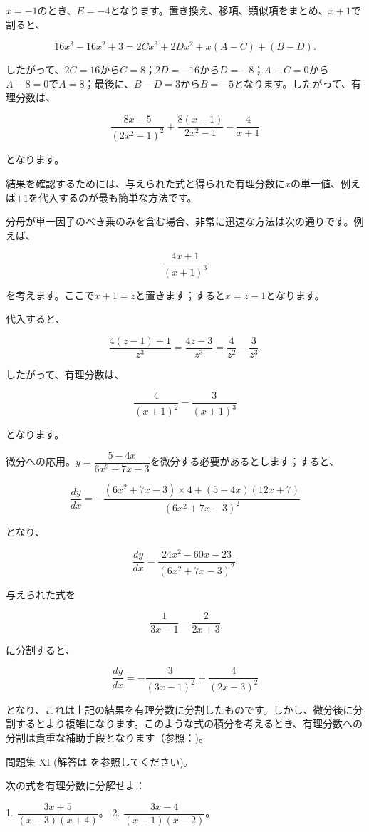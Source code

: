 \documentclass[a4paper,11pt,openany]{ltjsbook}
\begin{document}
$x = -1$のとき、$E = -4$となります。置き換え、移項、類似項をまとめ、$x+1$で割ると、

\[
16x^3 - 16x^2 + 3 = 2Cx^3 + 2Dx^2 + x(A - C) + (B - D).
\]

したがって、$2C = 16$から$C = 8$；$2D = -16$から$D = -8$；$A - C = 0$から$A - 8 = 0$で$A = 8$；最後に、$B - D = 3$から$B = -5$となります。したがって、有理分数は、

\[
\frac{8x-5}{(2x^2-1)^2} + \frac{8(x-1)}{2x^2-1} - \frac{4}{x+1}
\]

となります。

結果を確認するためには、与えられた式と得られた有理分数に$x$の単一値、例えば$+1$を代入するのが最も簡単な方法です。

分母が単一因子のべき乗のみを含む場合、非常に迅速な方法は次の通りです。例えば、

\[
\frac{4x + 1}{(x + 1)^3}
\]

を考えます。ここで$x + 1 = z$と置きます；すると$x = z - 1$となります。

代入すると、

\[
\frac{4(z - 1) + 1}{z^3} = \frac{4z - 3}{z^3} = \frac{4}{z^2} - \frac{3}{z^3}.
\]

したがって、有理分数は、

\[
\frac{4}{(x+1)^2} - \frac{3}{(x+1)^3}
\]

となります。

微分への応用。$y = \dfrac{5-4x}{6x^2 + 7x - 3}$を微分する必要があるとします；すると、

\[
\frac{dy}{dx} = -\frac{(6x^2+7x-3) \times  4 + (5 - 4x)(12x + 7)}{(6x^2 + 7x - 3)^2}
\]

となり、

\[
\frac{dy}{dx} = \frac{24x^2 - 60x - 23}{(6x^2 + 7x - 3)^2}.
\]

与えられた式を

\[
\frac{1}{3x-1} - \frac{2}{2x+3}
\]

に分割すると、

\[
\frac{dy}{dx} = -\frac{3}{(3x-1)^2} + \frac{4}{(2x+3)^2}
\]

となり、これは上記の結果を有理分数に分割したものです。しかし、微分後に分割するとより複雑になります。このような式の積分を考えるとき、有理分数への分割は貴重な補助手段となります（参照：\pageref{partfracs})。

問題集 XI (解答は \pageref[page]{AnsEx:XI} を参照してください)。

次の式を有理分数に分解せよ：

1. $\dfrac{3x + 5}{(x - 3)(x + 4)}$。
2. $\dfrac{3x - 4}{(x - 1)(x - 2)}$。
\end{document}
